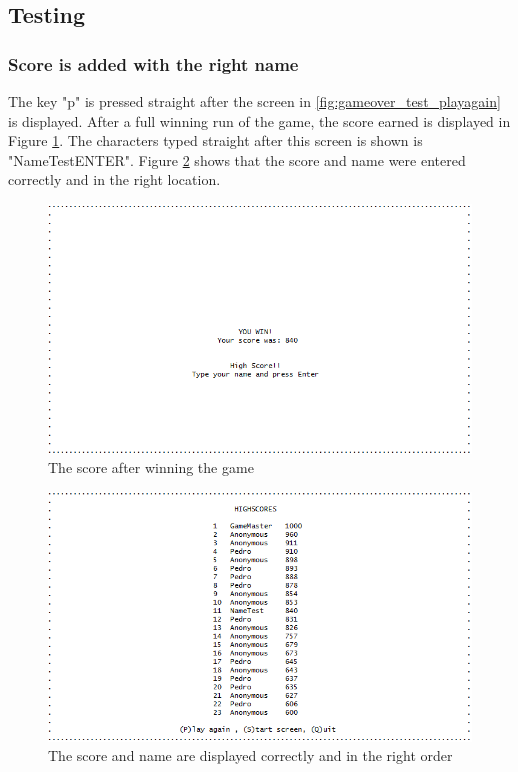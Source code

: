 \documentclass{article}
\begin{document}
\newpage
\subsection*{Testing}
\subsubsection*{Score is added with the right name}
The key "p" is pressed straight after the screen in \ref{fig:gameover_test_playagain} is displayed. After a full winning run of the game, the score earned is displayed in Figure \ref{fig:hscore_test_name}. The characters typed straight after this screen is shown is "NameTestENTER". Figure \ref{fig:hscore_test_name2} shows that the score and name were entered correctly and in the right location.
\begin{figure}[!ht]
	\begin{center}
	\includegraphics[width=0.6\paperwidth]{images/hscore_test_name}
	\caption{The score after winning the game}
	\label{fig:hscore_test_name} 
	\end{center}
\end{figure}
\begin{figure}[!ht]
	\begin{center}
	\includegraphics[width=0.6\paperwidth]{images/hscore_test_name2}
	\caption{The score and name are displayed correctly and in the right order}
	\label{fig:hscore_test_name2} 
	\end{center}
\end{figure}
\newpage
\end{document}

